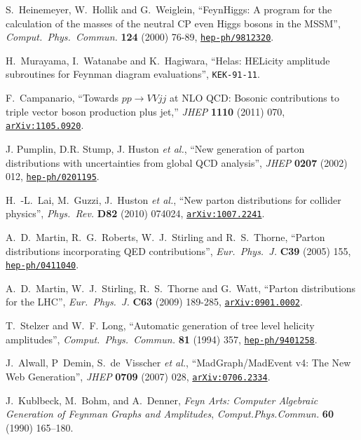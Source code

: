 \documentclass[english,12pt]{article}
\begin{document}
\begin{thebibliography}{10}
  S.~Heinemeyer, W.~Hollik and G.~Weiglein,
  ``FeynHiggs: A program for the calculation of the masses of the neutral CP even Higgs bosons in the MSSM'',
  {\em Comput.\ Phys.\ Commun.}  {\bf 124} (2000)  76-89,
\href{https://www.arXiv.org/abs/hep-ph/9812320}{{\tt hep-ph/9812320}}.

H.~Murayama, I.~Watanabe and K.~Hagiwara, ``Helas: HELicity amplitude
  subroutines for Feynman diagram evaluations'', {\tt KEK-91-11}.

  F.~Campanario,
  ``Towards $pp \rightarrow VVjj$ at NLO QCD: Bosonic contributions to triple vector boson production plus jet,''
  {\em JHEP} {\bf 1110} (2011) 070,
  \href{https://www.arXiv.org/abs/1105.0920}{{\tt arXiv:1105.0920}}.

J. Pumplin, D.R. Stump, J. Huston {\em et al.}, ``New generation of parton distributions with
  uncertainties from global QCD analysis'', {\em JHEP} {\bf 0207} (2002) 012,
\href{https://www.arXiv.org/abs/hep-ph/0201195}{{\tt hep-ph/0201195}}.

  H.~-L.~Lai, M.~Guzzi, J.~Huston {\it et al.},
  ``New parton distributions for collider physics'',
  {\em Phys.\ Rev.}  {\bf D82} (2010)  074024,
\href{https://www.arXiv.org/abs/1007.2241}{{\tt arXiv:1007.2241}}.

  A.~D.~Martin, R.~G.~Roberts, W.~J.~Stirling and R.~S.~Thorne,
  ``Parton distributions incorporating QED contributions'',
  {\em Eur.\ Phys.\ J.} {\bf C39} (2005) 155,
\href{https://www.arXiv.org/abs/hep-ph/0411040}{{\tt hep-ph/0411040}}.

  A.~D.~Martin, W.~J.~Stirling, R.~S.~Thorne and G.~Watt,
  ``Parton distributions for the LHC'',
  {\em Eur.\ Phys.\ J.} {\bf C63} (2009)  189-285,
  \href{https://arxiv.org/abs/0901.0002}{{\tt arXiv:0901.0002}}.

T.~Stelzer and W.~F. Long, ``{Automatic generation of tree level helicity
  amplitudes}'', {\em Comput.\ Phys.\ Commun.} {\bf 81} (1994) 357,
\href{https://www.arXiv.org/abs/hep-ph/9401258}{{\tt hep-ph/9401258}}.

J.~Alwall, P~Demin, S.~de~Visscher {\em et al.}, ``{MadGraph/MadEvent v4: The New Web Generation}'',
  {\em JHEP} {\bf 0709} (2007) 028,
\href{https://www.arXiv.org/abs/0706.2334}{{\tt arXiv:0706.2334}}.

J.~Kublbeck, M.~Bohm, and A.~Denner, {\it {Feyn Arts: Computer Algebraic Generation
  of Feynman Graphs and Amplitudes}},  {\em Comput.Phys.Commun.}
  {\bf 60} (1990) 165--180.


\end{thebibliography}
\end{document}
